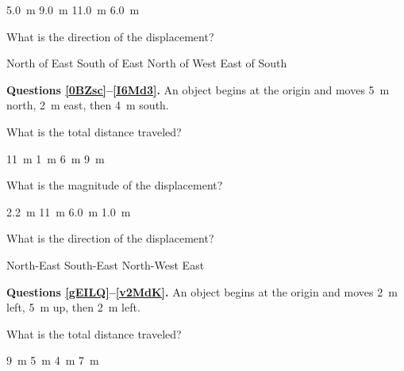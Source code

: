 \documentclass[answers]{exam}
\begin{document}
\begin{questions}
\begin{randomizechoices}
    \correctchoice \SI{5.0}{m}
    \choice \SI{9.0}{m}
    \choice \SI{11.0}{m}
    \choice \SI{6.0}{m}
\end{randomizechoices}

\question \label{njuRm}
What is the direction of the displacement?

\begin{randomizechoices}
    \correctchoice North of East
    \choice South of East
    \choice North of West
    \choice East of South
\end{randomizechoices}

\begin{EnvUplevel}
    \textbf{Questions \ref{0BZsc}--\ref{I6Md3}.} An object begins at the origin and moves \SI{5}{m} north, \SI{2}{m} east, then \SI{4}{m} south.
\end{EnvUplevel}


\question \label{0BZsc}
What is the total distance traveled?

\begin{randomizechoices}
    \correctchoice \SI{11}{m}
    \choice \SI{1}{m}
    \choice \SI{6}{m}
    \choice \SI{9}{m}
\end{randomizechoices}

\question
What is the magnitude of the displacement?

\begin{randomizechoices}
    \correctchoice \SI{2.2}{m}
    \choice \SI{11}{m}
    \choice \SI{6.0}{m}
    \choice \SI{1.0}{m}
\end{randomizechoices}

\question \label{I6Md3}
What is the direction of the displacement?

\begin{randomizechoices}
    \correctchoice North-East
    \choice South-East
    \choice North-West
    \choice East
\end{randomizechoices}

\begin{EnvUplevel}
    \textbf{Questions \ref{gEILQ}--\ref{v2MdK}.} An object begins at the origin and moves \SI{2}{m} left, \SI{5}{m} up, then \SI{2}{m} left.
\end{EnvUplevel}


\question \label{gEILQ}
What is the total distance traveled?
\begin{randomizechoices}
    \correctchoice \SI{9}{m}
    \choice \SI{5}{m}
    \choice \SI{4}{m}
    \choice \SI{7}{m}
\end{randomizechoices}


\end{questions}
\end{document}

